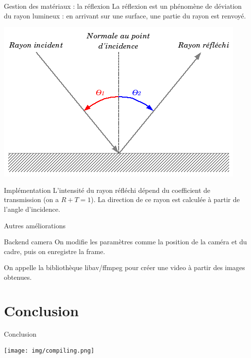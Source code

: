 \documentclass{beamer}
\begin{document}
\begin{frame}{Gestion des matériaux : la réflexion}
La réflexion est un phénomène de déviation du rayon lumineux : en arrivant sur
une surface, une partie du rayon est renvoyé.

\begin{center}
  \includegraphics[scale=0.4]{img/introduction.png}
\end{center}

\begin{block}{Implémentation}
L'intensité du rayon réfléchi dépend du coefficient de transmission (on a
$R+T=1$). La direction de ce rayon est calculée à partir de l'angle d'incidence.
\end{block}
\end{frame}

\begin{frame}{Autres améliorations}
\begin{block}{Backend camera}
On modifie les paramètres comme la position de la caméra et du cadre, puis on enregistre la frame.

On appelle la bibliothèque libav/ffmpeg pour créer une video à partir des images obtenues.
\end{block}
\end{frame}

\section{Conclusion}
\begin{frame}{Conclusion}

\begin{center}
  \texttt{[image: img/compiling.png]}
\end{center}

\end{frame}
\end{document}
